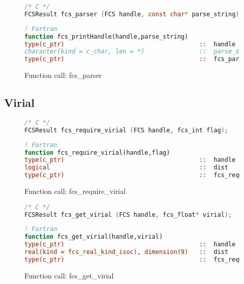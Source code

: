 \begin{figure}[htb]
\begin{lstlisting}[language=C,frame=trBL,breaklines,basicstyle=\ttfamily,prebreak={\raisebox{0ex}[0ex][0ex]{\ensuremath{\hookleftarrow}}}]
/* C */
FCSResult fcs_parser (FCS handle, const char* parse_string);
\end{lstlisting}
\begin{lstlisting}[language=Fortran,frame=trBL,breaklines,basicstyle=\ttfamily,prebreak={\raisebox{0ex}[0ex][0ex]{\ensuremath{\hookleftarrow}}}]
! Fortran
function fcs_printHandle(handle,parse_string)
type(c_ptr)                                     ::  handle
character(kind = c_char, len = *)               ::  parse_string
type(c_ptr)                                     ::  fcs_parser
\end{lstlisting}
\caption{Function call: fcs\_parser}
\label{fig:fcs_parser}
\end{figure}

\FloatBarrier
\subsection{Virial}

\begin{figure}[htb]
\begin{lstlisting}[language=C,frame=trBL,breaklines,basicstyle=\ttfamily,prebreak={\raisebox{0ex}[0ex][0ex]{\ensuremath{\hookleftarrow}}}]
/* C */
FCSResult fcs_require_virial (FCS handle, fcs_int flag);
\end{lstlisting}
\begin{lstlisting}[language=Fortran,frame=trBL,breaklines,basicstyle=\ttfamily,prebreak={\raisebox{0ex}[0ex][0ex]{\ensuremath{\hookleftarrow}}}]
! Fortran
function fcs_require_virial(handle,flag)
type(c_ptr)                                     ::  handle
logical                                         ::  dist
type(c_ptr)                                     ::  fcs_require_virial
\end{lstlisting}
\caption{Function call: fcs\_require\_virial}
\label{fig:fcs_require_virial}
\end{figure}

\begin{figure}[htb]
\begin{lstlisting}[language=C,frame=trBL,breaklines,basicstyle=\ttfamily,prebreak={\raisebox{0ex}[0ex][0ex]{\ensuremath{\hookleftarrow}}}]
/* C */
FCSResult fcs_get_virial (FCS handle, fcs_float* virial);
\end{lstlisting}
\begin{lstlisting}[language=Fortran,frame=trBL,breaklines,basicstyle=\ttfamily,prebreak={\raisebox{0ex}[0ex][0ex]{\ensuremath{\hookleftarrow}}}]
! Fortran
function fcs_get_virial(handle,virial)
type(c_ptr)                                     ::  handle
real(kind = fcs_real_kind_isoc), dimension(9)   ::  dist
type(c_ptr)                                     ::  fcs_require_virial
\end{lstlisting}
\caption{Function call: fcs\_get\_virial}
\label{fig:fcs_get_virial}
\end{figure}

